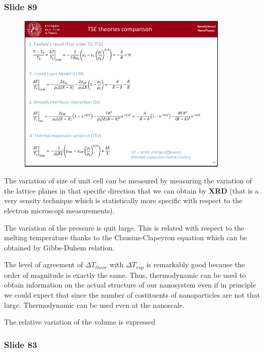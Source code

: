 \documentclass[../main/main.tex]{subfiles}
\begin{document}
\subsubsection{Slide 89}

\begin{figure}[h!]
\centering
\includegraphics[page=8,width=0.9\textwidth]{../lessons/pdf_file/5_lesson.pdf}
\end{figure}

The variation of size of unit cell can be measured by measuring the variation of the lattice planes in that specific direction that we can obtain by \textbf{XRD} (that is a very sensity technique which is statistically more specific with respect to the electron microscopi measurements).

The variation of the pressure is quit large. This is related with respect to the melting temperature thanks to the Clausius-Clapeyron equation which can be obtained by Gibbs-Duhem relation.

The level of agreement of \( \Delta T_{theor} \) with \( \Delta T_{exp} \) is remarkably good because the order of magnitude is exactly the same.
Thus, thermodynamic can be used to  obtain information on the actual structure of our nanosystem even if in principle we could expect that since the number of costituents of nanoparticles are not that large. Thermodynamic can be used even at the nanoscale.


The relative variation of the volume is expressed

\newpage

\subsubsection{Slide 83}
\end{document}
